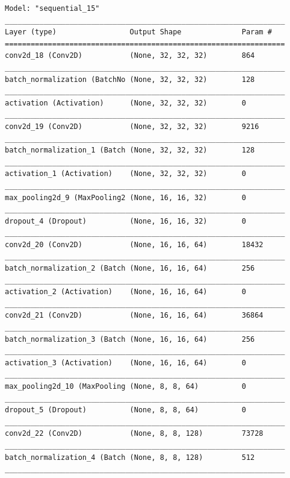 \documentclass[10pt,english, openany]{book}
\begin{document}
\begin{verbatim}
Model: "sequential_15"
_________________________________________________________________
Layer (type)                 Output Shape              Param #   
=================================================================
conv2d_18 (Conv2D)           (None, 32, 32, 32)        864       
_________________________________________________________________
batch_normalization (BatchNo (None, 32, 32, 32)        128       
_________________________________________________________________
activation (Activation)      (None, 32, 32, 32)        0         
_________________________________________________________________
conv2d_19 (Conv2D)           (None, 32, 32, 32)        9216      
_________________________________________________________________
batch_normalization_1 (Batch (None, 32, 32, 32)        128       
_________________________________________________________________
activation_1 (Activation)    (None, 32, 32, 32)        0         
_________________________________________________________________
max_pooling2d_9 (MaxPooling2 (None, 16, 16, 32)        0         
_________________________________________________________________
dropout_4 (Dropout)          (None, 16, 16, 32)        0         
_________________________________________________________________
conv2d_20 (Conv2D)           (None, 16, 16, 64)        18432     
_________________________________________________________________
batch_normalization_2 (Batch (None, 16, 16, 64)        256       
_________________________________________________________________
activation_2 (Activation)    (None, 16, 16, 64)        0         
_________________________________________________________________
conv2d_21 (Conv2D)           (None, 16, 16, 64)        36864     
_________________________________________________________________
batch_normalization_3 (Batch (None, 16, 16, 64)        256       
_________________________________________________________________
activation_3 (Activation)    (None, 16, 16, 64)        0         
_________________________________________________________________
max_pooling2d_10 (MaxPooling (None, 8, 8, 64)          0         
_________________________________________________________________
dropout_5 (Dropout)          (None, 8, 8, 64)          0         
_________________________________________________________________
conv2d_22 (Conv2D)           (None, 8, 8, 128)         73728     
_________________________________________________________________
batch_normalization_4 (Batch (None, 8, 8, 128)         512       
_________________________________________________________________

\end{verbatim}
\end{document}
